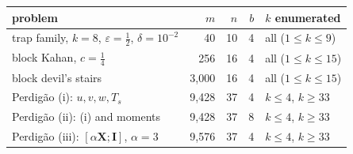 \begin{tabular}{@{}l r r r l@{}}
\toprule
problem & $m$ & $n$ & $b$ & $k$ enumerated\\
\midrule
trap family, $k=8$, $\varepsilon=\tfrac12$, $\delta=10^{-2}$ & 40 & 10 & 4 & all ($1\le k\le 9$)\\
block Kahan, $c=\tfrac14$ & 256 & 16 & 4 & all ($1\le k\le 15$)\\
block devil's stairs & 3,000 & 16 & 4 & all ($1\le k\le 15$)\\
Perdig\~ao (i): $u,v,w,T_s$ & 9,428 & 37 & 4 & $k\le 4$, $k\ge 33$\\
Perdig\~ao (ii): (i) and moments & 9,428 & 37 & 8 & $k\le 4$, $k\ge 33$\\
Perdig\~ao (iii): $[\alpha\mathbf X;\mathbf I]$, $\alpha=3$ & 9,576 & 37 & 4 & $k\le 4$, $k\ge 33$\\
\bottomrule
\end{tabular}
